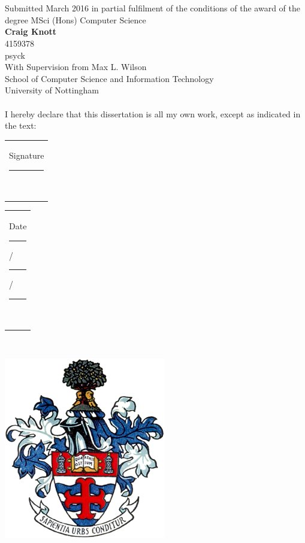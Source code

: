 \begin{center}
\ \\[1cm]
\LARGE{\textbf{\paperTitleStart}}\ \\[0.5cm]
\large{Submitted March 2016 in partial fulfilment of the conditions of the award of the degree MSci (Hons) Computer Science}
\ \\[1cm]
\large{\textbf{Craig Knott}} \ \\
\large{4159378}\ \\
\large{psyck}\ \\[0.3cm]

With Supervision from Max L. Wilson\\[0.3cm]

School of Computer Science and Information Technology \ \\
University of Nottingham \ \\
 \ \\[0.5cm]
I hereby declare that this dissertation is all my own work, except as indicated in the text: \ \\[1cm]
\end{center}

\begin{Large}
\begin{center}
\begin{tabular}{l}
Signature \rule{5cm}{1pt} \ \\[0.2cm]
\end{tabular}
\end{center}

\begin{center}
\begin{tabular}{l}
Date \rule{1.5cm}{1pt}/\rule{1.5cm}{1pt}/\rule{1.5cm}{1pt}\ \\
\end{tabular}
\end{center}
\end{Large}

\ \\[0.6cm]
\begin{center}
\includegraphics[scale=0.55]{images/UoN_Arms}
\end{center}